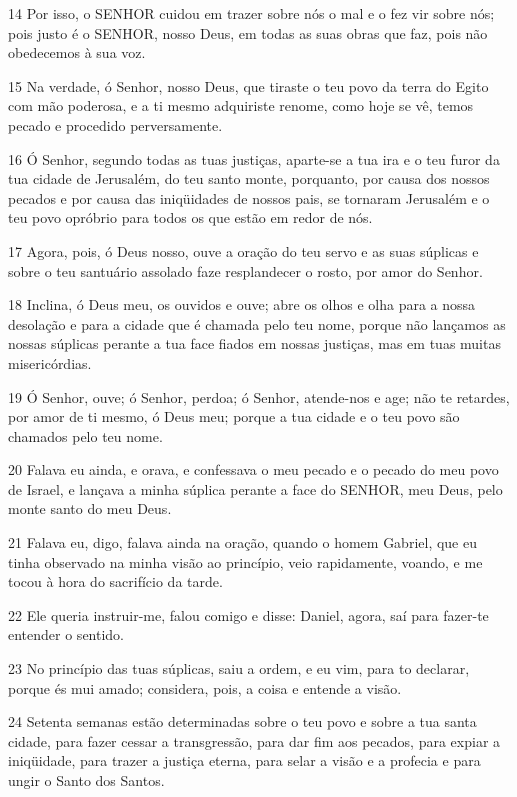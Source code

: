 \par 14 Por isso, o SENHOR cuidou em trazer sobre nós o mal e o fez vir sobre nós; pois justo é o SENHOR, nosso Deus, em todas as suas obras que faz, pois não obedecemos à sua voz.
\par 15 Na verdade, ó Senhor, nosso Deus, que tiraste o teu povo da terra do Egito com mão poderosa, e a ti mesmo adquiriste renome, como hoje se vê, temos pecado e procedido perversamente.
\par 16 Ó Senhor, segundo todas as tuas justiças, aparte-se a tua ira e o teu furor da tua cidade de Jerusalém, do teu santo monte, porquanto, por causa dos nossos pecados e por causa das iniqüidades de nossos pais, se tornaram Jerusalém e o teu povo opróbrio para todos os que estão em redor de nós.
\par 17 Agora, pois, ó Deus nosso, ouve a oração do teu servo e as suas súplicas e sobre o teu santuário assolado faze resplandecer o rosto, por amor do Senhor.
\par 18 Inclina, ó Deus meu, os ouvidos e ouve; abre os olhos e olha para a nossa desolação e para a cidade que é chamada pelo teu nome, porque não lançamos as nossas súplicas perante a tua face fiados em nossas justiças, mas em tuas muitas misericórdias.
\par 19 Ó Senhor, ouve; ó Senhor, perdoa; ó Senhor, atende-nos e age; não te retardes, por amor de ti mesmo, ó Deus meu; porque a tua cidade e o teu povo são chamados pelo teu nome.
\par 20 Falava eu ainda, e orava, e confessava o meu pecado e o pecado do meu povo de Israel, e lançava a minha súplica perante a face do SENHOR, meu Deus, pelo monte santo do meu Deus.
\par 21 Falava eu, digo, falava ainda na oração, quando o homem Gabriel, que eu tinha observado na minha visão ao princípio, veio rapidamente, voando, e me tocou à hora do sacrifício da tarde.
\par 22 Ele queria instruir-me, falou comigo e disse: Daniel, agora, saí para fazer-te entender o sentido.
\par 23 No princípio das tuas súplicas, saiu a ordem, e eu vim, para to declarar, porque és mui amado; considera, pois, a coisa e entende a visão.
\par 24 Setenta semanas estão determinadas sobre o teu povo e sobre a tua santa cidade, para fazer cessar a transgressão, para dar fim aos pecados, para expiar a iniqüidade, para trazer a justiça eterna, para selar a visão e a profecia e para ungir o Santo dos Santos.
